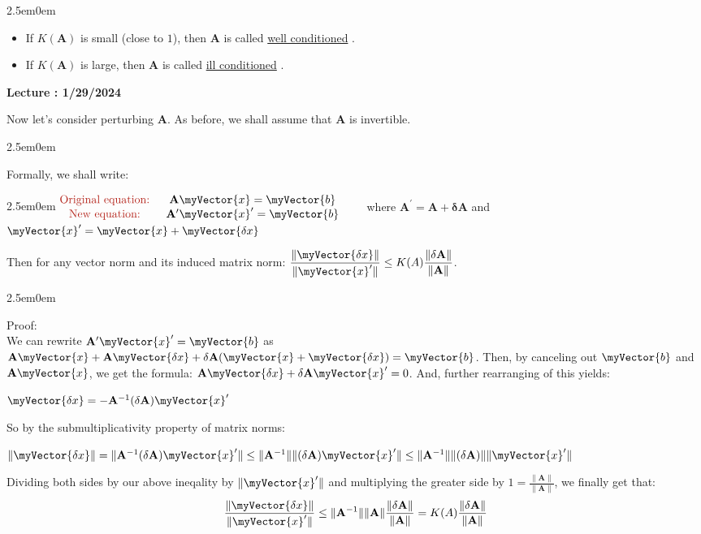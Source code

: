 \documentclass{book}
\newcommand{\hTwo}{%
   \color{MidnightBlue}%
   \fontsize{13}{15}\selectfont%
}
\newcommand{\hThree}{%
   \color{PineGreen}
   \fontsize{13}{15}\selectfont%
}
\newcommand{\hFour}{%
   \color{Cerulean}
   \fontsize{12}{14}\selectfont%
}
\newenvironment{myIndent}{%
   \begin{adjustwidth}{2.5em}{0em}%
}{%
   \end{adjustwidth}%
}
\newcommand{\udefine}[1]{%
   {\setulcolor{Red}%
   \setul{0.14em}{0.07em}%
   \ul{#1}}%
}
\newcounter{LectureNumber}
\newcommand*{\markLecture}[1]{%
   \stepcounter{LectureNumber}%
   {\huge \color{Black} \textbf{Lecture \theLectureNumber: #1} \newline}%
}
\newcommand{\retTwo}{\hfill\bigbreak}
\newcommand{\mVec}[1]{\myVector{#1}}
\newcommand{\mMat}[1]{\mathbf{#1}}
\begin{document}
{\begin{myIndent}
      \begin{itemize}
         \item If $K(\mMat{A})$ is small (close to $1$), then $\mMat{A}$ is called \udefine{well conditioned}.
         \item If $K(\mMat{A})$ is large, then $\mMat{A}$ is called \udefine{ill conditioned}. \retTwo
      \end{itemize}
   \end{myIndent}}

   \markLecture{1/29/2024}

   Now let's consider perturbing $\mMat{A}$. As before, we shall assume that $\mMat{A}$ is invertible.
   {\begin{myIndent} \hTwo
      Formally, we shall write:
      \begin{myIndent} $
         \begin{matrix}
            \text{\color{BrickRed}Original equation: } & \mMat{A}\mVec{x} = \mVec{b} \\
            \text{\color{BrickRed}New equation: } & \mMat{A}^\prime\mVec{x}^\prime = \mVec{b}
         \end{matrix}\quad \quad$ {\hFour where $\mMat{A}^\prime = \mMat{A} + \mMat{\delta A}$ and $\mVec{x}^\prime = \mVec{x} + \mVec{\delta x}$}
      \end{myIndent}

      Then for any vector norm and its induced matrix norm: $\dfrac{\|\mVec{\delta x}\|}{\|\mVec{x}^\prime\|} \leq K(A)\dfrac{\|\mMat{\delta A}\|}{\|\mMat{A}\|}$.\retTwo

      {\begin{myIndent} \hThree
         Proof:\\
         We can rewrite $\mMat{A}^\prime\mVec{x}^\prime = \mVec{b}$ as $\mMat{A}\mVec{x} + \mMat{A}\mVec{\delta x} + \mMat{\delta A}(\mVec{x} + \mVec{\delta x}) = \mVec{b}$. Then, by canceling out $\mVec{b}$ and $\mMat{A}\mVec{x}$, we get the formula: $\mMat{A}\mVec{\delta x} + \mMat{\delta A}\mVec{x}^\prime = 0$. And, further rearranging of this yields:

         {\centering $\mVec{\delta x} = -\mMat{A}^{-1}(\mMat{\delta A})\mVec{x}^\prime$ \retTwo \par}

         So by the submultiplicativity property of matrix norms:

         {\centering $\|\mVec{\delta x}\| = \|\mMat{A}^{-1}(\mMat{\delta A})\mVec{x}^\prime\| \leq \|\mMat{A}^{-1}\|\|(\mMat{\delta A})\mVec{x}^\prime\| \leq \|\mMat{A}^{-1}\|\|(\mMat{\delta A})\|\|\mVec{x}^\prime\|$ \retTwo \par}

         Dividing both sides by our above ineqality by $\|\mVec{x}^\prime\|$ and multiplying the greater side by $1 = \frac{\|\mMat{A}\|}{\|\mMat{A}\|}$, we finally get that:
         \[\dfrac{\|\mVec{\delta x}\|}{\|\mVec{x}^\prime\|} \leq \|\mMat{A}^{-1}\|\|\mMat{A}\|\dfrac{\|\mMat{\delta A}\|}{\|\mMat{A}\|} =  K(A)\dfrac{\|\mMat{\delta A}\|}{\|\mMat{A}\|}\]
      \end{myIndent}}
   \end{myIndent}}
\end{document}
